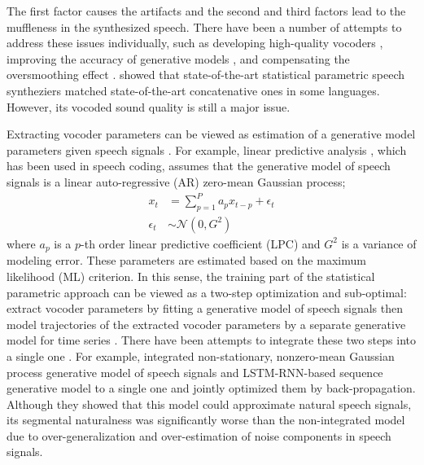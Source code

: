 \documentclass{article}
\def\Gauss{\mathcal{N}}
\begin{document}
The first factor causes the artifacts and the second and third factors lead to the muffleness in the synthesized speech.
There have been a number of attempts to address these issues individually, such as developing high-quality vocoders \citep{Kawahara_STRAIGHT,Vocaine,WORLD}, improving the accuracy of generative models \citep{Zen_trjHMM_CSL,Zen_DNN_ICASSP,Fan_BLSTM_Interspeech14,Uria_TrajectoryRNADE_ICASSP2015}, and compensating the oversmoothing effect \citep{Toda_MLGV_IEICE,Takamichi_ModulationSpectrum_TASLP}.
\cite{Zen_LSTMprod_Interspeech} showed that state-of-the-art statistical parametric speech syntheziers matched state-of-the-art concatenative ones in some languages.
However, its vocoded sound quality is still a major issue.

Extracting vocoder parameters can be viewed as estimation of a generative model parameters given speech signals \citep{LPC,UELS}.
For example, linear predictive analysis \citep{LPC}, which has been used in speech coding, assumes that the generative model of speech signals is 
a linear auto-regressive (AR) zero-mean Gaussian process;
\begin{align}
  x_t &= \sum_{p=1}^P a_p x_{t-p} + \epsilon_t \\
  \epsilon_t &\sim \Gauss(0, G^2)
\end{align}
where $a_p$ is a $p$-th order linear predictive coefficient (LPC) and $G^2$ 
is a variance of modeling error.
These parameters are estimated based on the maximum likelihood (ML) criterion.
In this sense, the training part of the statistical parametric approach can be viewed as a two-step optimization and sub-optimal: extract vocoder parameters by fitting a generative model of speech signals then model trajectories of the extracted vocoder parameters by a separate generative model for time series \citep{Tokuda_ASRU2011}.
There have been attempts to integrate these two steps into a single one
\citep{STAVOCO,MGELSD,Maia_WaveformModel_SSW,Kazuhiro_McepHMM_IEICE,Black_AutoEncoder_arXiv,Tokuda_CepLSTM_ICASSP2015,Tokuda_MixCepLSTM_ICASSP2016,Takaki_FFTDNN_ICASSP}.
For example, \cite{Tokuda_MixCepLSTM_ICASSP2016} integrated non-stationary, nonzero-mean Gaussian process generative model of speech signals and LSTM-RNN-based sequence generative model to a single one and jointly optimized them by back-propagation.
Although they showed that this model could approximate natural speech signals, its segmental naturalness was significantly worse than the non-integrated model due to over-generalization and over-estimation of noise components in speech signals.
\end{document}
